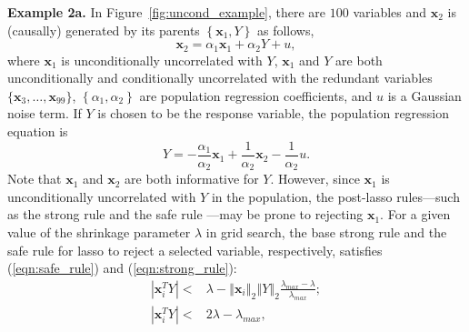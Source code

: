 \documentclass[11pt,review,authoryear]{elsarticle}
\begin{document}
\smallskip
\noindent
\textbf{Example 2a.} In Figure~\ref{fig:uncond_example}, there are $100$ variables and $\mathbf{x}_2$ is (causally) generated by its parents $\left\{ \mathbf{x}_1, Y \right\}$ as follows,
%
\begin{equation}
  \mathbf{x}_2 = \alpha_1 \mathbf{x}_1 + \alpha_2 Y + u,
  \label{eqn:collider_1}
\end{equation}
%
where $\mathbf{x}_1$ is unconditionally uncorrelated with $Y$, $\mathbf{x}_1$ and $Y$ are both unconditionally and conditionally uncorrelated with the redundant variables $\{\mathbf{x}_3, \ldots, \mathbf{x}_{99}\}$, $\left\{\alpha_1, \alpha_2 \right\}$ are population regression coefficients, and $u$ is a Gaussian noise term. If $Y$ is chosen to be the response variable, the population regression equation is
%
\begin{equation}
  Y = -\frac{\alpha_1}{\alpha_2} \mathbf{x}_1 + \frac{1}{\alpha_2} \mathbf{x}_2 - \frac{1}{\alpha_2}u.
  \label{eqn:collider_2}
\end{equation}
%
Note that $\mathbf{x}_1$ and $\mathbf{x}_2$ are both informative for $Y$. However, since $\mathbf{x}_1$ is unconditionally uncorrelated with $Y$ in the population, the post-lasso rules---such as the strong rule \citep{tibshirani2012strong} and the safe rule \citep{ghaoui2010safe}---may be prone to rejecting $\mathbf{x}_1$. For a given value of the shrinkage parameter $\lambda$ in grid search, the base strong rule and the safe rule for lasso to reject a selected variable, respectively, satisfies (\ref{eqn:safe_rule}) and (\ref{eqn:strong_rule}):
%
\begin{eqnarray}
  \left\vert \mathbf{x}_i^T Y \right\vert < & \lambda - \left\Vert \mathbf{x}_i \right\Vert_2 \left\Vert Y \right\Vert_2 \frac{\lambda_{max} - \lambda} {\lambda_{max}} ; \label{eqn:safe_rule} \\
  \left\vert \mathbf{x}_i^T Y \right\vert < & 2\lambda - \lambda_{max} , \label{eqn:strong_rule}
  \label{eqn:post_estmation_rule}
\end{eqnarray}
%
\end{document}
